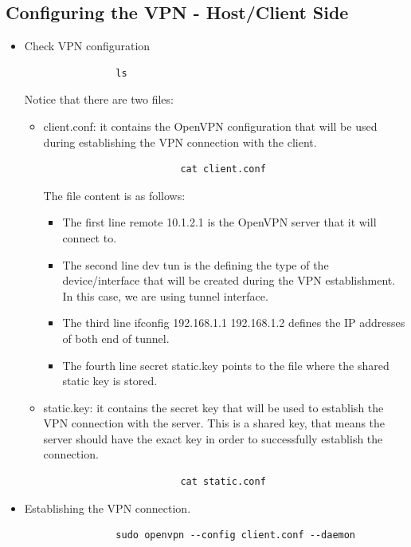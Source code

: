 \subsection{Configuring the VPN - Host/Client Side}
\begin{itemize}
	\item Check VPN configuration

		\begin{verbatim}
				ls
		\end{verbatim}

		Notice that there are two files:

		\begin{itemize}
			\item client.conf: it contains the OpenVPN configuration that will be used during establishing the VPN connection with the client.
				\begin{verbatim}
						cat client.conf
				\end{verbatim}

				The file content is as follows:
					\begin{itemize}
						\item The first line remote 10.1.2.1 is the OpenVPN server that it will connect to.
						\item The second line dev tun is the defining the type of the device/interface that will be created during the VPN establishment. In this case, we are using tunnel interface.
						\item The third line ifconfig 192.168.1.1 192.168.1.2 defines the IP addresses of both end of tunnel.
						\item The fourth line secret static.key points to the file where the shared static key is stored.
					\end{itemize}
			\item static.key:  it contains the secret key that will be used to establish the VPN connection with the server. This is a shared key, that means the server should have the exact key in order to successfully establish the connection.
				\begin{verbatim}
						cat static.conf
				\end{verbatim}

		\end{itemize}

	\item Establishing the VPN connection.
		\begin{verbatim}
				sudo openvpn --config client.conf --daemon
		\end{verbatim}
\end{itemize}


